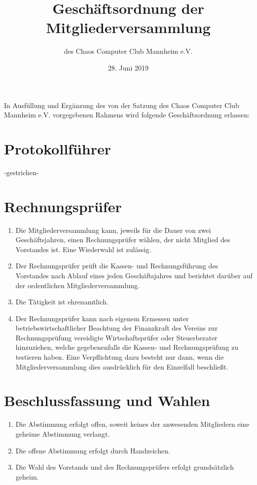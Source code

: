 \documentclass[a4paper, 12pt]{scrartcl}
\title{Geschäftsordnung der Mitgliederversammlung}
\subtitle{des Chaos Computer Club Mannheim e.V.}
\author{}
\date{28. Juni 2019}
\begin{document}
\maketitle

\noindent In Ausfüllung und Ergänzung des von der Satzung des Chaos Computer Club
Mannheim e.V. vorgegebenen Rahmens wird folgende Geschäftsordnung erlassen:

\section{Protokollführer}
-gestrichen-

\section{Rechnungsprüfer}
\begin{enumerate}
	\item Die Mitgliederversammlung kann, jeweils für die Dauer von zwei
Geschäftsjahren, einen Rechnungsprüfer wählen, der nicht Mitglied des
Vorstandes ist. Eine Wiederwahl ist zulässig.
	\item Der Rechnungsprüfer prüft die Kassen- und Rechnungsführung des
Vorstandes nach Ablauf eines jeden Geschäftsjahres und berichtet darüber
auf der ordentlichen Mitgliederversammlung.
	\item Die Tätigkeit ist ehrenamtlich.
	\item Der Rechnungsprüfer kann nach eigenem Ermessen unter
betriebswirtschaftlicher Beachtung der Finanzkraft des Vereins zur
Rechnungsprüfung vereidigte Wirtschaftsprüfer oder Steuerberater
hinzuziehen, welche gegebenenfalls die Kassen- und Rechnungsprüfung zu
testieren haben. Eine Verpflichtung dazu besteht nur dann, wenn die
Mitgliederversammlung dies ausdrücklich für den Einzelfall beschließt.
\end{enumerate}

\section{Beschlussfassung und Wahlen}
\begin{enumerate}
	\item Die Abstimmung erfolgt offen, soweit keines der anwesenden Mitgliedern eine geheime Abstimmung verlangt.
	\item Die offene Abstimmung erfolgt durch Handzeichen.
	\item Die Wahl des Vorstands und des Rechnungsprüfers erfolgt grundsätzlich geheim.
\end{enumerate}
\end{document}
